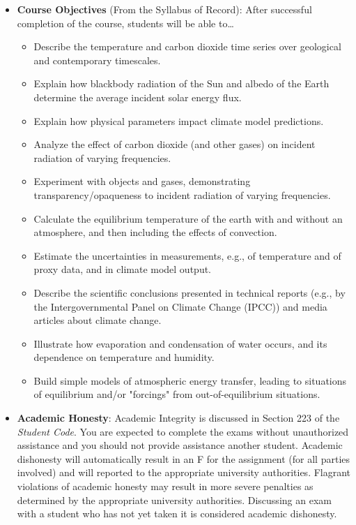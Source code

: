 \documentclass{article}
\begin{document}
\begin{itemize}
\item[] {\bf Course Objectives} (From the Syllabus of Record): After successful completion of the course, students will be able to\ldots
	\begin{itemize}
	\item Describe the temperature and carbon dioxide time series over geological and contemporary timescales. 
	\item Explain how blackbody radiation of the Sun and albedo of the Earth determine the average incident solar energy flux. 
	\item Explain how physical parameters impact climate model predictions. 
	\item Analyze the effect of carbon dioxide (and other gases) on incident radiation of varying frequencies. 
	\item Experiment with objects and gases, demonstrating transparency/opaqueness to incident radiation of varying frequencies. 
	\item Calculate the equilibrium temperature of the earth with and without an atmosphere, and then including the effects of convection. 
	\item Estimate the uncertainties in measurements, e.g., of temperature and of proxy data, and in climate model output. 
	\item Describe the scientific conclusions presented in technical reports (e.g., by the Intergovernmental Panel on Climate Change (IPCC)) and media articles about climate change.
	\item Illustrate how evaporation and condensation of water occurs, and its dependence on temperature and humidity. 
	\item Build simple models of atmospheric energy transfer, leading to situations of equilibrium and/or "forcings" from out-of-equilibrium situations.
	\end{itemize}
	
\item[] {\bf Academic Honesty}: Academic Integrity is discussed in Section 223 of the {\em Student Code}. You are expected to complete the exams without unauthorized assistance and you should not provide assistance another student. Academic dishonesty will automatically result in an F for the assignment (for all parties involved) and will reported to the appropriate university authorities.  Flagrant violations of academic honesty may result in more severe penalties as determined by the appropriate university authorities.  Discussing an exam with a student who has not yet taken it is considered academic dishonesty.


\end{itemize}
\end{document}
